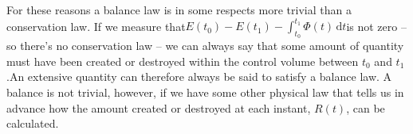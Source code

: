 \documentclass[a4paper,12pt,%
onecolumn,oneside,%
british%
]{memoir}
\newcommand*{\di}{\mathrm{d}}%
\renewcommand*{\|}[1][]{\nonscript\:#1\vert\nonscript\:\mathopen{}}
\newcommand*{\yti}{t_{0}}
\newcommand*{\ytf}{t_{1}}
\newcommand*{\yE}{E}
\newcommand*{\yH}{\varPhi}%
\newcommand*{\yR}{R}%
\begin{document}
%
%
For these reasons a balance law is in some respects more trivial than a conservation law. If we measure that\enskip$\yE(\yti) - \yE(\ytf) - \int_{\yti}^{\ytf}\!\yH(t)\, \di t$\enskip is not zero -- so there's no conservation law -- we can always say that some amount of quantity must have been created or destroyed within the control volume between $\yti$ and $\ytf$.\enskip An extensive quantity can therefore always be said to satisfy a balance law. A balance is not trivial, however, if we have some other physical law that tells us in advance how the amount created or destroyed at each instant, $\yR(t)$, can be calculated.
\end{document}
